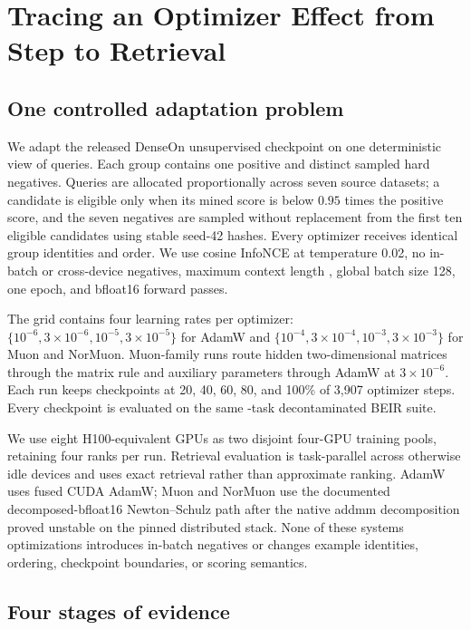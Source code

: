 \documentclass[11pt]{article}
\begin{document}
\section{Tracing an Optimizer Effect from Step to Retrieval}

\subsection{One controlled adaptation problem}

We adapt the released DenseOn unsupervised checkpoint on one deterministic view of
\NumTrainingQueries{} queries. Each group contains one positive and \NumHardNegatives{} distinct
sampled hard negatives. Queries are allocated proportionally across seven source datasets; a
candidate is eligible only when its mined score is below $0.95$ times the positive score, and the
seven negatives are sampled without replacement from the first ten eligible candidates using
stable seed-42 hashes. Every optimizer receives identical group identities and order. We use cosine
InfoNCE at temperature 0.02, no in-batch or cross-device negatives, maximum context length
\ContextLength{}, global batch size 128, one epoch, and bfloat16 forward passes.

The grid contains four learning rates per optimizer: $\{10^{-6},3\!\times\!10^{-6},10^{-5},
3\!\times\!10^{-5}\}$ for AdamW and $\{10^{-4},3\!\times\!10^{-4},10^{-3},3\!\times\!10^{-3}\}$
for Muon and NorMuon. Muon-family runs route hidden two-dimensional matrices through the matrix
rule and auxiliary parameters through AdamW at $3\!\times\!10^{-6}$. Each run keeps checkpoints at
20, 40, 60, 80, and 100\% of 3,907 optimizer steps. Every checkpoint is evaluated on the same
\NumBEIRTasks-task decontaminated BEIR suite.

We use eight H100-equivalent GPUs as two disjoint four-GPU training pools, retaining four ranks per
run. Retrieval evaluation is task-parallel across otherwise idle devices and uses exact retrieval
rather than approximate ranking. AdamW uses fused CUDA AdamW; Muon and NorMuon use the documented
decomposed-bfloat16 Newton--Schulz path after the native addmm decomposition proved unstable on the
pinned distributed stack. None of these systems optimizations introduces in-batch negatives or
changes example identities, ordering, checkpoint boundaries, or scoring semantics.

\subsection{Four stages of evidence}
\end{document}
